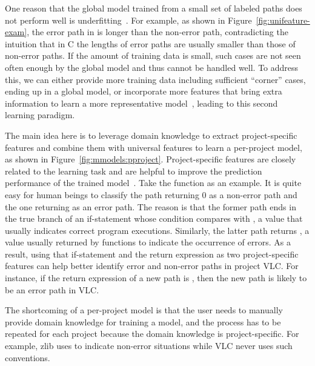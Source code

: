 \documentclass[12pt]{report}	%
\begin{document}
%
One reason that the global model trained from a small set of labeled paths
does not perform well is underfitting~\cite{alpaydin2009introduction}.
%
For example, as shown in Figure~\ref{fig:unifeature-exam},
the error path in  is longer than the non-error path,
contradicting the intuition that in C the lengths of error paths are usually smaller than those of non-error paths.
%
If the amount of training data is small,
such cases are not seen often enough by the global model
and thus cannot be handled well.
%
To address this, we can either provide more training data including sufficient ``corner'' cases, 
ending up in a global model,
or incorporate more features that bring extra information to learn a more representative model~\cite{hua2004optimal,zhang2018strategy},
leading to this second learning paradigm.
%

The main idea here is to leverage domain 
knowledge to extract project-specific features
and combine them with universal features to learn a per-project model,
as shown in Figure~\ref{fig:mmodels:pproject}.
Project-specific features are closely related to the learning task 
and are helpful to improve the prediction performance of the trained model~\cite{kopanas2002role}.
%
Take the function  as an example. 
It is quite easy for human beings to 
classify the path returning 0 as a non-error path
and the one returning  as an error path.
%
The reason is that the former path ends in the true branch of an if-statement
whose condition compares with , 
a value that usually indicates correct program executions.
Similarly, the latter path returns ,
a value usually returned
by functions to indicate the occurrence of errors.
%
As a result, using that if-statement and the return expression 
as two project-specific features can help better identify error and non-error paths in project VLC.
For instance, if the return expression of a new path is ,
then the new path is likely to be an error path in VLC.

The shortcoming of a per-project model is that
the user needs to manually provide domain knowledge for training a model,
and the process has to be repeated for each project
because the domain knowledge is project-specific.
For example, zlib uses  to indicate non-error situations 
while VLC never uses such conventions. 
\end{document}

